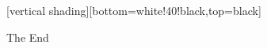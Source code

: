 \documentclass{beamer}
\begin{document}
\begin{frame}\end{frame}
[vertical shading][bottom=white!40!black,top=black]

\begin{frame}
  \begin{centering}
    The End
    \par
  \end{centering}
\end{frame}
\end{document}
